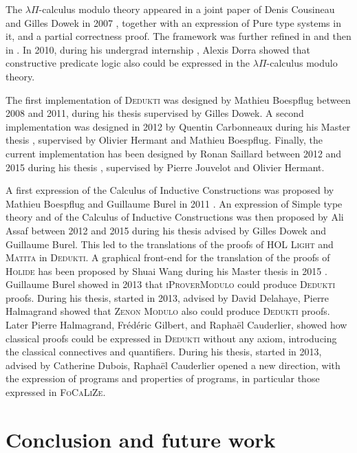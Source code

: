 \documentclass[english]{lipics}
\begin{document}
The $\lambda \Pi$-calculus modulo theory appeared in a joint paper of
Denis Cousineau and Gilles Dowek in 2007 \cite{CousineauDowek},
together with an expression of Pure type systems in it, and a partial
correctness proof. The framework was further refined in \cite{RSai13}
and then in \cite{Saillard15}. In 2010, during his undergrad internship
\cite{Dorra}, Alexis Dorra showed that constructive predicate logic
also could be expressed in the $\lambda \Pi$-calculus modulo theory.

The first implementation of \textsc{Dedukti} was designed by Mathieu
Boespflug \cite{Boespflug} between 2008 and 2011, during his thesis
supervised by Gilles Dowek. A second implementation was designed in 2012
by Quentin Carbonneaux during his Master thesis \cite{Carbonneaux},
supervised by Olivier Hermant and Mathieu Boespflug.  Finally, the
current implementation has been designed by Ronan Saillard between
2012 and 2015 during his thesis \cite{Saillard15}, supervised by Pierre
Jouvelot and Olivier Hermant.

A first expression of the Calculus of Inductive Constructions was
proposed by Mathieu Boespflug and Guillaume Burel in 2011
\cite{BoespflugBurel2012}.  An expression of Simple type theory and of
the Calculus of Inductive Constructions was then proposed by Ali Assaf
between 2012 and 2015 during his thesis \cite{AssafThese} advised by
Gilles Dowek and Guillaume Burel. This led to the translations of the
proofs of \textsc{HOL Light} and \textsc{Matita} in
\textsc{Dedukti}. A graphical front-end for the translation of the proofs of
\textsc{Holide} has been proposed by Shuai Wang during his Master thesis
in 2015 \cite{Wang}.
Guillaume Burel \cite{Burel13} showed in 2013 that
\textsc{iProverModulo} could produce \textsc{Dedukti} proofs. During
his thesis, started in 2013, advised by David Delahaye, Pierre
Halmagrand showed that \textsc{Zenon Modulo} also could produce
\textsc{Dedukti} proofs. Later Pierre Halmagrand, Fr\'ed\'eric Gilbert,
and Rapha\"el Cauderlier, showed how classical proofs could be
expressed in \textsc{Dedukti} without any axiom, introducing the classical
connectives and quantifiers. During his thesis,
started in 2013, advised by Catherine Dubois, Rapha\"el Cauderlier
opened a new direction, with the expression of programs and properties
of programs, in particular those expressed in \textsc{FoCaLiZe}.

\section{Conclusion and future work}
\end{document}

